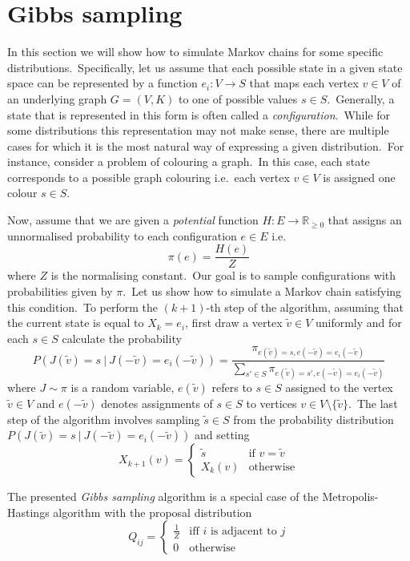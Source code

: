 \documentclass[shortabstract, english, lic]{iithesis}
\theoremstyle{default_theorem_style}\newtheorem{theorem}{Theorem}
\theoremstyle{default_theorem_style}\newtheorem{definition}{Definition}
\begin{document}
\section{Gibbs sampling}\label{sec:gibbs_sampling}

\noindent In this section we will show how to simulate Markov chains for some specific distributions.\ Specifically,
let us assume that each possible state in a given state space can be represented by a function $e_i : V \to S$ that
maps each vertex $v \in V$ of an underlying graph $G = (V, K)$ to one of possible values $s \in S$.\ Generally, a state
that is represented in this form is often called a \textit{configuration}.\ While for some distributions this
representation may not make sense, there are multiple cases for which it is the most natural way of expressing a
given distribution.\ For instance, consider a problem of colouring a graph.\ In this case, each state corresponds to a
possible graph colouring i.e.\ each vertex $v \in V$ is assigned one colour $s \in S$.\newline

\noindent Now, assume that we are given a \textit{potential} function $H : E \to \mathbb R_{\geq 0}$ that assigns an
unnormalised probability to each configuration $e \in E$ i.e.\
$$
\pi(e) = \frac{H(e)}{Z}
$$
where $Z$ is the normalising constant.\ Our goal is to sample configurations with probabilities given by $\pi$.\ Let
us show how to simulate a Markov chain satisfying this condition.\ To
perform the $(k + 1)$-th step of the algorithm, assuming that the current state is equal to
$X_k = e_i$, first draw a vertex $\tilde{v} \in V$ uniformly and for each $s \in S$ calculate the probability
$$
P(J(\tilde{v}) = s\ |\ J(-\tilde{v})=e_i(-\tilde{v})) = \frac{\pi_{e(\tilde{v}) =
s,e(-\tilde{v}) = e_i(-\tilde{v})}}{\sum_{s' \in S} \pi_{e(\tilde{v}) = s', e(-\tilde{v}) = e_i(-\tilde{v})}}
$$
where $J \sim \pi$ is a random variable, $e(\tilde{v})$ refers to $s \in S$ assigned to the vertex $\tilde{v} \in V$ and
$e(-\tilde{v})$ denotes assignments of $s \in S$ to vertices $v \in V \setminus \{\tilde{v}\}$.\ The last step of
the algorithm involves sampling $\tilde{s} \in S$ from the probability distribution
$P(J(\tilde{v}) = s\ |\ J(-\tilde{v})=e_i(-\tilde{v}))$ and setting
$$
X_{k + 1}(v) =
\begin{cases}
  \tilde{s} &\text{if $v = \tilde{v}$}\\
  X_k(v) &\text{otherwise}
\end{cases}
$$

\noindent The presented \textit{Gibbs sampling} algorithm is a special case of the Metropolis-Hastings algorithm
with the proposal distribution
$$
Q_{ij} =
\begin{cases}
  \frac{1}{Z} &\text{iff $i$ is adjacent to $j$}\\
  0 &\text{otherwise}
\end{cases}
$$
\end{document}
